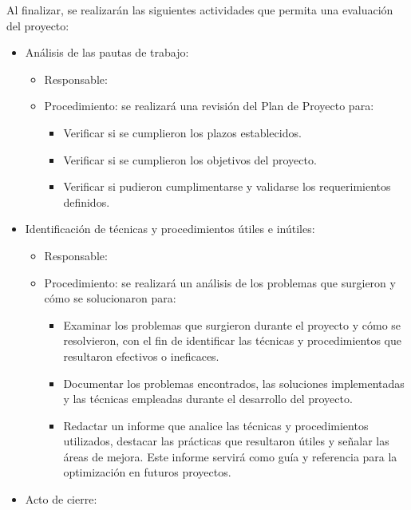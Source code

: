 Al finalizar, se realizarán las siguientes actividades que permita
una evaluación del proyecto:

\begin{itemize}
	\item Análisis de las pautas de trabajo:
	      \begin{itemize}
		      \item Responsable: \authorname 
		      \item Procedimiento: se realizará una revisión del Plan de Proyecto para:
		            \begin{itemize}
			            \item Verificar si se cumplieron los plazos establecidos.
			            \item Verificar si se cumplieron los objetivos del proyecto.
			            \item Verificar si pudieron cumplimentarse y validarse los requerimientos definidos.
		            \end{itemize}
	      \end{itemize}
	\item Identificación de técnicas y procedimientos útiles e inútiles:
	      \begin{itemize}
		      \item Responsable: \authorname
		      \item Procedimiento: se realizará un análisis de los problemas que surgieron y cómo
		            se solucionaron para:
		            \begin{itemize}
			            \item Examinar los problemas que surgieron durante el proyecto y cómo se resolvieron,
			                  con el fin de identificar las técnicas y procedimientos que resultaron
			                  efectivos o ineficaces.
			            \item Documentar los problemas encontrados, las soluciones implementadas y las
			                  técnicas empleadas durante el desarrollo del proyecto.
			            \item Redactar un informe que analice las técnicas y procedimientos utilizados,
			                  destacar las prácticas que resultaron útiles y señalar las áreas de mejora.
			                  Este informe servirá como guía y referencia para la optimización en futuros
			                  proyectos.
		            \end{itemize}
	      \end{itemize}
	\item Acto de cierre:

\end{itemize}
